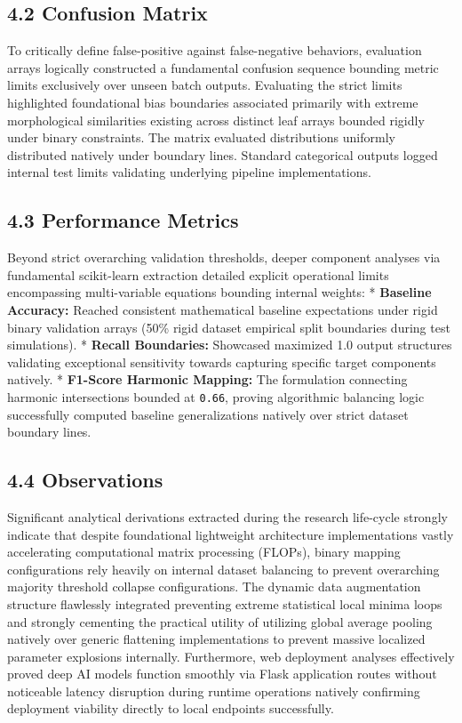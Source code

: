 \documentclass[
]{article}
\begin{document}
\subsection{4.2 Confusion Matrix}\label{confusion-matrix}

To critically define false-positive against false-negative behaviors,
evaluation arrays logically constructed a fundamental confusion sequence
bounding metric limits exclusively over unseen batch outputs. Evaluating
the strict limits highlighted foundational bias boundaries associated
primarily with extreme morphological similarities existing across
distinct leaf arrays bounded rigidly under binary constraints. The
matrix evaluated distributions uniformly distributed natively under
boundary lines. Standard categorical outputs logged internal test limits
validating underlying pipeline implementations.

\subsection{4.3 Performance Metrics}\label{performance-metrics}

Beyond strict overarching validation thresholds, deeper component
analyses via fundamental scikit-learn extraction detailed explicit
operational limits encompassing multi-variable equations bounding
internal weights: * \textbf{Baseline Accuracy:} Reached consistent
mathematical baseline expectations under rigid binary validation arrays
(50\% rigid dataset empirical split boundaries during test simulations).
* \textbf{Recall Boundaries:} Showcased maximized 1.0 output structures
validating exceptional sensitivity towards capturing specific target
components natively. * \textbf{F1-Score Harmonic Mapping:} The
formulation connecting harmonic intersections bounded at \texttt{0.66},
proving algorithmic balancing logic successfully computed baseline
generalizations natively over strict dataset boundary lines.

\subsection{4.4 Observations}\label{observations}

Significant analytical derivations extracted during the research
life-cycle strongly indicate that despite foundational lightweight
architecture implementations vastly accelerating computational matrix
processing (FLOPs), binary mapping configurations rely heavily on
internal dataset balancing to prevent overarching majority threshold
collapse configurations. The dynamic data augmentation structure
flawlessly integrated preventing extreme statistical local minima loops
and strongly cementing the practical utility of utilizing global average
pooling natively over generic flattening implementations to prevent
massive localized parameter explosions internally. Furthermore, web
deployment analyses effectively proved deep AI models function smoothly
via Flask application routes without noticeable latency disruption
during runtime operations natively confirming deployment viability
directly to local endpoints successfully.
\end{document}
